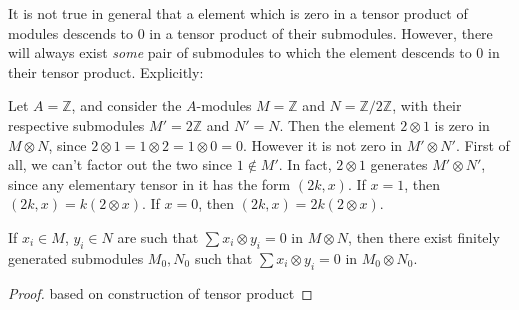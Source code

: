 \documentclass[12pt]{article}
\begin{document}


It is not true in general that a element which is zero in a tensor product of modules descends to 0 in a tensor product of their submodules. However, there will always exist \emph{some} pair of submodules to which the element descends to 0 in their tensor product. Explicitly:

\begin{example}
	Let $A=\mathbb{Z}$, and consider the $A$-modules $M=\mathbb{Z}$ and $N=\mathbb{Z}/2\mathbb{Z}$, with their respective submodules $M'=2\mathbb{Z}$ and $N'=N$. Then the element $2\otimes 1$ is zero in $M\otimes N$, since $2\otimes 1=1\otimes 2=1\otimes 0=0$. However it is not zero in $M'\otimes N'$. First of all, we can't factor out the two since $1\not\in M'$. In fact, $2\otimes 1$ generates $M'\otimes N'$, since any elementary tensor in it has the form $(2k,x)$. If $x=1$, then $(2k,x)=k(2\otimes x)$. If $x=0$, then $(2k,x)=2k(2\otimes x)$.
\end{example}

\begin{corollary}
	If $x_i\in M$, $y_i\in N$ are such that $\sum x_i\otimes y_i=0$ in $M\otimes N$, then there exist finitely generated submodules $M_0,N_0$ such that $\sum x_i\otimes y_i=0$ in $M_0\otimes N_0$.
\end{corollary}
\begin{proof}
	based on construction of tensor product 
\end{proof}
\end{document}
